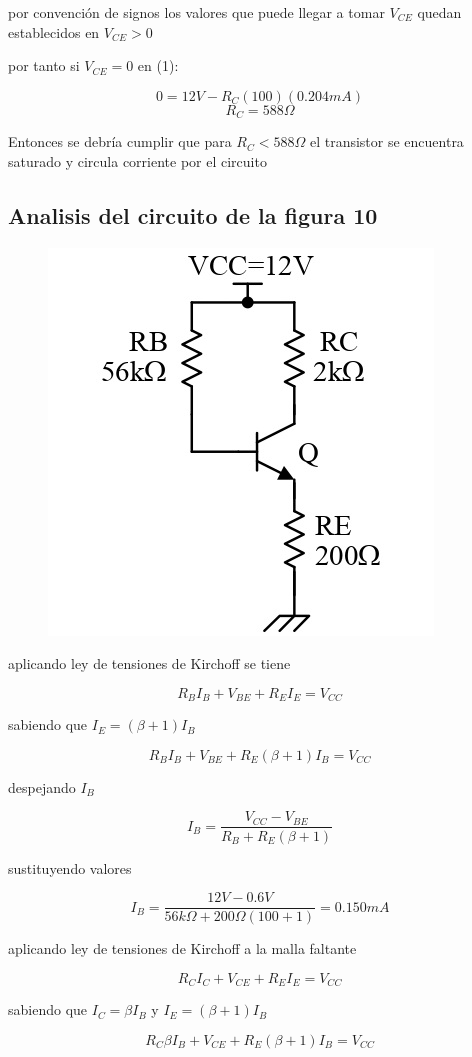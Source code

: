 \documentclass[10pt, a4paper]{article}
\begin{document}
    por convención de signos los valores que puede llegar a tomar $V_{CE}$ quedan establecidos  en $V_{CE} > 0$

    por tanto si $V_{CE} = 0$ en (1):

    $$0 = 12V - R_C (100) (0.204mA)$$
    $$R_C = 588\Omega$$

    Entonces se debría cumplir que para $R_C < 588\Omega$ el transistor se encuentra saturado y circula corriente por el circuito

    \subsection{Analisis del circuito de la figura 10}

    \begin{figure}[h!]
        \centering
        \includegraphics[height=5cm\textwidth]{circuito4.jpg}
    \end{figure}

    aplicando ley de tensiones de Kirchoff se tiene

    $$R_BI_B + V_{BE} + R_EI_E= V_{CC}$$

    sabiendo que $I_E = (\beta+1)I_B$

    $$R_BI_B + V_{BE} + R_E(\beta+1)I_B= V_{CC}$$

    despejando $I_B$

    $$I_B = \frac{V_{CC} - V_{BE}}{R_B + R_E(\beta + 1)}$$

    sustituyendo valores

    $$I_B = \frac{12V - 0.6V}{56k\Omega + 200\Omega (100 + 1)} = 0.150mA$$

    aplicando ley de tensiones de Kirchoff a la malla faltante

    $$R_CI_C + V_{CE} + R_EI_E = V_{CC}$$

    sabiendo que $I_C = \beta I_B$ y $I_E = (\beta + 1)I_B$

    $$R_C\beta I_B + V_{CE} + R_E(\beta + 1)I_B= V_{CC}$$
\end{document}
